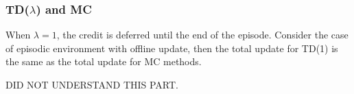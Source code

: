 \subsubsection*{TD(\(\lambda \)) and MC}
When \(\lambda = 1\), the credit is deferred until the end of the episode. Consider the 
case of episodic environment with offline update, then the total update for TD(1) is the same
as the total update for MC methods.
\begin{note}
    DID NOT UNDERSTAND THIS PART.
\end{note}